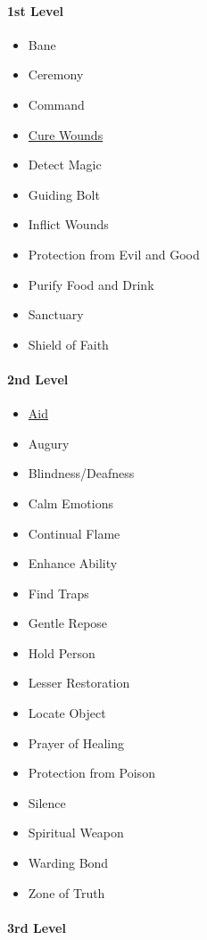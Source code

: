 \paragraph{1st Level}\label{_1st_level}

\begin{itemize}
\item
  Bane
\item
  Ceremony
\item
  Command
\item
  \hyperref[spell-cure-wounds]{Cure Wounds}
\item
  Detect Magic
\item
  Guiding Bolt
\item
  Inflict Wounds
\item
  Protection from Evil and Good
\item
  Purify Food and Drink
\item
  Sanctuary
\item
  Shield of Faith
\end{itemize}

\paragraph{2nd Level}\label{_2nd_level}

\begin{itemize}
\item
  \hyperref[spell-aid]{Aid}
\item
  Augury
\item
  Blindness/Deafness
\item
  Calm Emotions
\item
  Continual Flame
\item
  Enhance Ability
\item
  Find Traps
\item
  Gentle Repose
\item
  Hold Person
\item
  Lesser Restoration
\item
  Locate Object
\item
  Prayer of Healing
\item
  Protection from Poison
\item
  Silence
\item
  Spiritual Weapon
\item
  Warding Bond
\item
  Zone of Truth
\end{itemize}

\paragraph{3rd Level}\label{_3rd_level}

